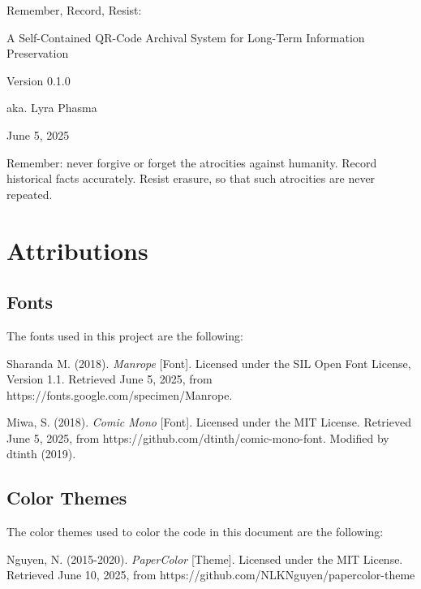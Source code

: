 

\renewcommand{\setflag}{\newif \ifwhole
\wholetrue}

\begin{titlepage}
  \centering
  \vspace*{\fill}

  {\fontsize{2.625em}{3em}\selectfont\ManropeExtraBold Remember, Record, Resist: \par}
  {\HUGE A Self-Contained QR-Code Archival System for Long-Term Information Preservation \par}
  {\Large Version 0.1.0 \par}
  {\Large aka. Lyra Phasma \par}
  {\Large June 5, 2025 \par}

  \vspace*{\fill}
\end{titlepage}

Remember: never forgive or forget the atrocities against humanity. Record historical facts accurately. Resist erasure, so that such atrocities are never repeated.

\appendix



\chapter{Attributions}

\section{Fonts}

The fonts used in this project are the following:

Sharanda M. (2018). \textit{Manrope} [Font]. Licensed under the SIL Open Font License, Version 1.1. Retrieved June 5, 2025, from https://fonts.google.com/specimen/Manrope.

Miwa, S. (2018). \textit{Comic Mono} [Font]. Licensed under the MIT License. Retrieved June 5, 2025, from https://github.com/dtinth/comic-mono-font. Modified by dtinth (2019).

\section{Color Themes}

The color themes used to color the code in this document are the following:

Nguyen, N. (2015-2020). \textit{PaperColor} [Theme]. Licensed under the MIT License. Retrieved June 10, 2025, from https://github.com/NLKNguyen/papercolor-theme

\printbibliography[heading=bibnumbered]


